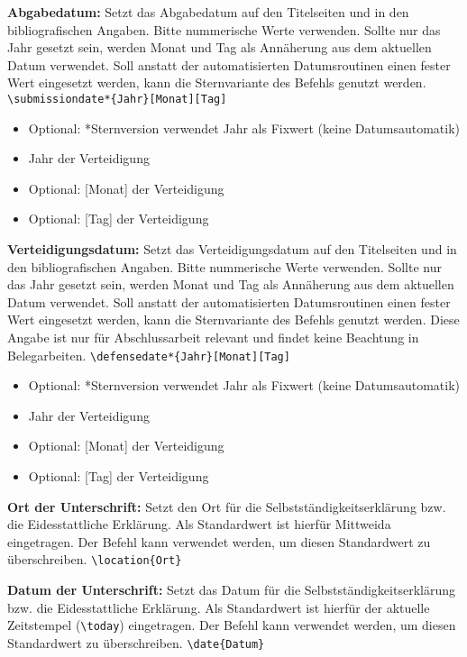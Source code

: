 \documentclass[
%
	thesis=paper,		%
	compactlistof,		%
	noauthorship,		%
%
	fancy,				%
%
%
]{hsmw-thesis}
\begin{document}
	\textbf{Abgabedatum:}\label{cmd:submissiondate}
	Setzt das Abgabedatum auf den Titelseiten und in den bibliografischen Angaben.
	Bitte nummerische Werte verwenden.
	Sollte nur das Jahr gesetzt sein, werden Monat und Tag als Annäherung aus dem aktuellen Datum verwendet.
	Soll anstatt der automatisierten Datumsroutinen einen fester Wert eingesetzt werden, kann die Sternvariante des Befehls genutzt werden.
	\newline
	\verb|\submissiondate*{Jahr}[Monat][Tag]|
	\begin{itemize}
		\item Optional: *Sternversion verwendet Jahr als Fixwert (keine Datumsautomatik)
		\item Jahr der Verteidigung
		\item Optional: [Monat] der Verteidigung
		\item Optional: [Tag] der Verteidigung
	\end{itemize}
	
	\textbf{Verteidigungsdatum:}\label{cmd:defensedate}
	Setzt das Verteidigungsdatum auf den Titelseiten und in den bibliografischen Angaben.
	Bitte nummerische Werte verwenden.
	Sollte nur das Jahr gesetzt sein, werden Monat und Tag als Annäherung aus dem aktuellen Datum verwendet.
	Soll anstatt der automatisierten Datumsroutinen einen fester Wert eingesetzt werden, kann die Sternvariante des Befehls genutzt werden.
	Diese Angabe ist nur für Abschlussarbeit relevant und findet keine Beachtung in Belegarbeiten.
	\newline
	\verb|\defensedate*{Jahr}[Monat][Tag]|
	\begin{itemize}
		\item Optional: *Sternversion verwendet Jahr als Fixwert (keine Datumsautomatik)
		\item Jahr der Verteidigung
		\item Optional: [Monat] der Verteidigung
		\item Optional: [Tag] der Verteidigung
	\end{itemize}
	
	\textbf{Ort der Unterschrift:}\label{cmd:location}
	Setzt den Ort für die Selbstständigkeitserklärung bzw. die Eidesstattliche Erklärung.
	Als Standardwert ist hierfür Mittweida eingetragen.
	Der Befehl kann verwendet werden, um diesen Standardwert zu überschreiben.
	\newline
	\verb|\location{Ort}|
	
	\textbf{Datum der Unterschrift:}\label{cmd:date}
	Setzt das Datum für die Selbstständigkeitserklärung bzw. die Eidesstattliche Erklärung.
	Als Standardwert ist hierfür der aktuelle Zeitstempel (\verb|\today|) eingetragen.
	Der Befehl kann verwendet werden, um diesen Standardwert zu überschreiben.
	\newline
	\verb|\date{Datum}|
	
\end{document}
